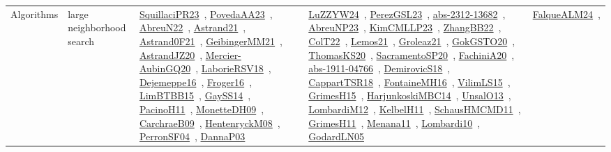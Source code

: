 {\begin{longtable}{lp{3cm}>{\raggedright\arraybackslash}p{6cm}>{\raggedright\arraybackslash}p{6cm}>{\raggedright\arraybackslash}p{8cm}}
\index{large neighborhood search}\index{Algorithms!large neighborhood search}Algorithms & large neighborhood search & \href{../works/SquillaciPR23.pdf}{SquillaciPR23}~\cite{SquillaciPR23}, \href{../works/PovedaAA23.pdf}{PovedaAA23}~\cite{PovedaAA23}, \href{../works/AbreuN22.pdf}{AbreuN22}~\cite{AbreuN22}, \href{../works/Astrand21.pdf}{Astrand21}~\cite{Astrand21}, \href{../works/Astrand0F21.pdf}{Astrand0F21}~\cite{Astrand0F21}, \href{../works/GeibingerMM21.pdf}{GeibingerMM21}~\cite{GeibingerMM21}, \href{../works/AstrandJZ20.pdf}{AstrandJZ20}~\cite{AstrandJZ20}, \href{../works/Mercier-AubinGQ20.pdf}{Mercier-AubinGQ20}~\cite{Mercier-AubinGQ20}, \href{../works/LaborieRSV18.pdf}{LaborieRSV18}~\cite{LaborieRSV18}, \href{../works/Dejemeppe16.pdf}{Dejemeppe16}~\cite{Dejemeppe16}, \href{../works/Froger16.pdf}{Froger16}~\cite{Froger16}, \href{../works/LimBTBB15.pdf}{LimBTBB15}~\cite{LimBTBB15}, \href{../works/GaySS14.pdf}{GaySS14}~\cite{GaySS14}, \href{../works/PacinoH11.pdf}{PacinoH11}~\cite{PacinoH11}, \href{../works/MonetteDH09.pdf}{MonetteDH09}~\cite{MonetteDH09}, \href{../works/CarchraeB09.pdf}{CarchraeB09}~\cite{CarchraeB09}, \href{../works/HentenryckM08.pdf}{HentenryckM08}~\cite{HentenryckM08}, \href{../works/PerronSF04.pdf}{PerronSF04}~\cite{PerronSF04}, \href{../works/DannaP03.pdf}{DannaP03}~\cite{DannaP03} & \href{../works/LuZZYW24.pdf}{LuZZYW24}~\cite{LuZZYW24}, \href{../works/PerezGSL23.pdf}{PerezGSL23}~\cite{PerezGSL23}, \href{../works/abs-2312-13682.pdf}{abs-2312-13682}~\cite{abs-2312-13682}, \href{../works/AbreuNP23.pdf}{AbreuNP23}~\cite{AbreuNP23}, \href{../works/KimCMLLP23.pdf}{KimCMLLP23}~\cite{KimCMLLP23}, \href{../works/ZhangBB22.pdf}{ZhangBB22}~\cite{ZhangBB22}, \href{../works/ColT22.pdf}{ColT22}~\cite{ColT22}, \href{../works/Lemos21.pdf}{Lemos21}~\cite{Lemos21}, \href{../works/Groleaz21.pdf}{Groleaz21}~\cite{Groleaz21}, \href{../works/GokGSTO20.pdf}{GokGSTO20}~\cite{GokGSTO20}, \href{../works/ThomasKS20.pdf}{ThomasKS20}~\cite{ThomasKS20}, \href{../works/SacramentoSP20.pdf}{SacramentoSP20}~\cite{SacramentoSP20}, \href{../works/FachiniA20.pdf}{FachiniA20}~\cite{FachiniA20}, \href{../works/abs-1911-04766.pdf}{abs-1911-04766}~\cite{abs-1911-04766}, \href{../works/DemirovicS18.pdf}{DemirovicS18}~\cite{DemirovicS18}, \href{../works/CappartTSR18.pdf}{CappartTSR18}~\cite{CappartTSR18}, \href{../works/FontaineMH16.pdf}{FontaineMH16}~\cite{FontaineMH16}, \href{../works/VilimLS15.pdf}{VilimLS15}~\cite{VilimLS15}, \href{../works/GrimesH15.pdf}{GrimesH15}~\cite{GrimesH15}, \href{../works/HarjunkoskiMBC14.pdf}{HarjunkoskiMBC14}~\cite{HarjunkoskiMBC14}, \href{../works/UnsalO13.pdf}{UnsalO13}~\cite{UnsalO13}, \href{../works/LombardiM12.pdf}{LombardiM12}~\cite{LombardiM12}, \href{../works/KelbelH11.pdf}{KelbelH11}~\cite{KelbelH11}, \href{../works/SchausHMCMD11.pdf}{SchausHMCMD11}~\cite{SchausHMCMD11}, \href{../works/GrimesH11.pdf}{GrimesH11}~\cite{GrimesH11}, \href{../works/Menana11.pdf}{Menana11}~\cite{Menana11}, \href{../works/Lombardi10.pdf}{Lombardi10}~\cite{Lombardi10}, \href{../works/GodardLN05.pdf}{GodardLN05}~\cite{GodardLN05} & \href{../works/FalqueALM24.pdf}{FalqueALM24}~\cite{FalqueALM24}, 
\end{longtable}}
